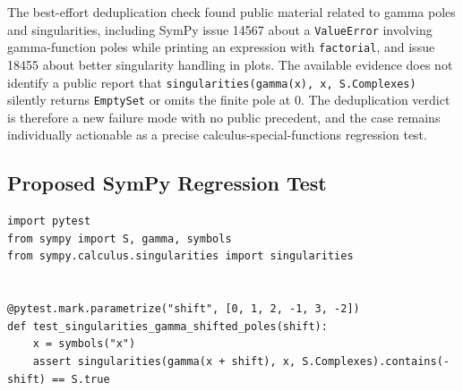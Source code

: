 \documentclass[11pt]{article}
\begin{document}
The best-effort deduplication check found public material related to gamma poles and singularities, including SymPy issue 14567 about a \texttt{ValueError} involving gamma-function poles while printing an expression with \texttt{factorial}, and issue 18455 about better singularity handling in plots. The available evidence does not identify a public report that \texttt{singularities(gamma(x), x, S.Complexes)} silently returns \texttt{EmptySet} or omits the finite pole at \(0\). The deduplication verdict is therefore a new failure mode with no public precedent, and the case remains individually actionable as a precise calculus-special-functions regression test.

\subsection{Proposed SymPy Regression Test}

\medskip

\begin{lstlisting}[style=bugpython]
import pytest
from sympy import S, gamma, symbols
from sympy.calculus.singularities import singularities


@pytest.mark.parametrize("shift", [0, 1, 2, -1, 3, -2])
def test_singularities_gamma_shifted_poles(shift):
    x = symbols("x")
    assert singularities(gamma(x + shift), x, S.Complexes).contains(-shift) == S.true
\end{lstlisting}
\end{document}
